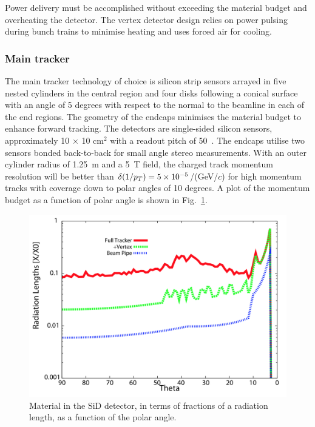 Power delivery must be accomplished without exceeding the material budget and
overheating the detector.  The vertex detector 
design relies on power pulsing during bunch trains to minimise heating 
and uses forced air for cooling. 

\subsubsection{Main tracker}
The main tracker technology of
choice is silicon strip sensors arrayed in five nested cylinders in the central
region and four disks following a conical surface with an angle of 5 degrees
with respect to the normal to the beamline in each of the end regions. The geometry of the endcaps
minimises the material budget to enhance forward tracking. The detectors are
single-sided silicon sensors, approximately 10 $\times$ 10 cm$^2$ with a readout
pitch of 50~\micron. The endcaps utilise two sensors bonded back-to-back for
small angle stereo measurements. With an outer cylinder radius of 1.25~m
and a 5~T field, the charged track momentum resolution will be better than
$\delta (1/p_T) = 5 \times 10^{-5} $/(GeV/$c$) for high momentum tracks with coverage down to polar angles of 10 degrees.
A plot of the momentum budget as a function of polar angle is shown in Fig.~\ref{fig:sid_mat_budget}.

\begin{figure}
\begin{center}
\includegraphics[width=0.80\hsize]{./chapters/figures/SiD_material_budget_tracker.png}
\end{center}
\caption{Material in the SiD detector, in terms of fractions of a radiation length, as a function of the polar angle.}
\label{fig:sid_mat_budget}
\end{figure}



